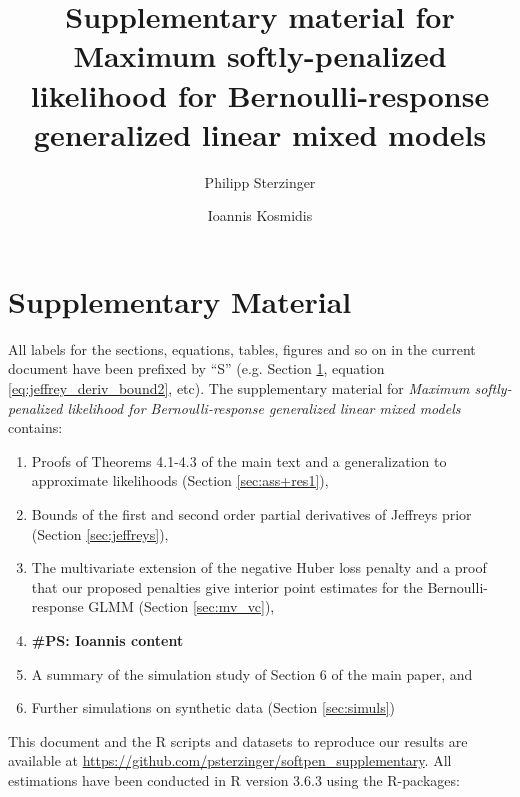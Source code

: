 \documentclass[11pt, a4paper]{article}
\title{Supplementary material for Maximum softly-penalized likelihood for Bernoulli-response generalized linear mixed models}
\author[1]{Philipp Sterzinger}
\author[1,2]{Ioannis Kosmidis}
\affil[1]{Department of Statistics, University of Warwick, Coventry, CV4 7AL, UK}
\affil[2]{The Alan Turing Institute, London, NW1 2DB, UK}
\newcommand{\PS}[1]{{\noindent \color{red} \bf \#PS: #1}}
\theoremstyle{example} \newtheorem{example}{Example}[section]
\theoremstyle{theorem} \newtheorem{theorem}{Theorem}[section]
\theoremstyle{theorem }\newtheorem{proposition}{Proposition}[section]
\theoremstyle{theorem }\newtheorem{corollary}{Corollary}[section]
\begin{document}
	\maketitle
	
	\section{Supplementary Material}
		\label{sec:supp}
	All labels for the sections, equations, tables, figures and so on in the current document have been prefixed by ``S'' (e.g. Section \ref{sec:supp}, equation \eqref{eq:jeffrey_deriv_bound2}, etc). The supplementary material for \textit{Maximum softly-penalized likelihood for Bernoulli-response generalized linear mixed models} contains:
	\begin{enumerate}[label=\roman{*})]
		\item Proofs of Theorems 4.1-4.3 of the main text and a generalization to approximate likelihoods (Section \ref{sec:ass+res1}), 
		\item Bounds of the first and second order partial derivatives of Jeffreys prior (Section \ref{sec:jeffreys}), 
		\item The multivariate extension of the negative Huber loss penalty and a proof that our proposed penalties give interior point estimates for the Bernoulli-response GLMM (Section \ref{sec:mv_vc}),
		\item \PS{Ioannis content}  
		\item A summary of the simulation study of Section 6 of the main paper, and
		\item Further simulations on synthetic data (Section \ref{sec:simuls})
	\end{enumerate}
	This document and the R scripts and datasets to reproduce our results are available at \linebreak \url{https://github.com/psterzinger/softpen_supplementary}. All estimations have been conducted in R version 3.6.3 \citep{R} using the R-packages: 
\end{document}
